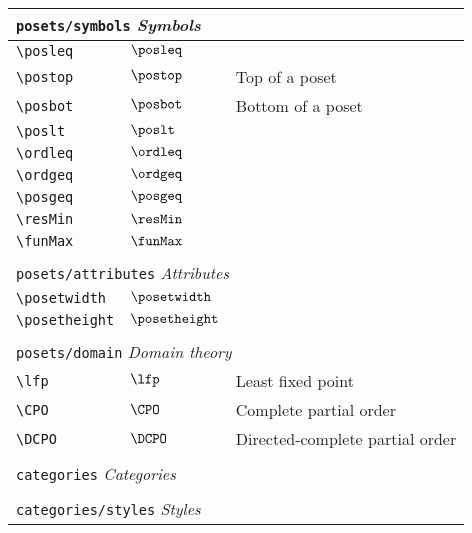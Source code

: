 \begin{longtable}{lll}
 \multicolumn{3}{l}{{\color[rgb]{0.5,0.5,0.5}\texttt{posets/symbols}} \emph{Symbols}}\\ 
 \hline
{\color[rgb]{0.5,0.5,0.5}\texttt{\textbackslash posleq}} & $\posleq$ & \\ 
 {\color[rgb]{0.5,0.5,0.5}\texttt{\textbackslash postop}} & $\postop$ &  Top of a poset\\ 
 {\color[rgb]{0.5,0.5,0.5}\texttt{\textbackslash posbot}} & $\posbot$ &  Bottom of a poset\\ 
 {\color[rgb]{0.5,0.5,0.5}\texttt{\textbackslash poslt}} & $\poslt$ & \\ 
 {\color[rgb]{0.5,0.5,0.5}\texttt{\textbackslash ordleq}} & $\ordleq$ & \\ 
 {\color[rgb]{0.5,0.5,0.5}\texttt{\textbackslash ordgeq}} & $\ordgeq$ & \\ 
 {\color[rgb]{0.5,0.5,0.5}\texttt{\textbackslash posgeq}} & $\posgeq$ & \\ 
 {\color[rgb]{0.5,0.5,0.5}\texttt{\textbackslash resMin}} & $\resMin$ & \\ 
 {\color[rgb]{0.5,0.5,0.5}\texttt{\textbackslash funMax}} & $\funMax$ & \\ 
  &  & \\ 
 \multicolumn{3}{l}{{\color[rgb]{0.5,0.5,0.5}\texttt{posets/attributes}} \emph{Attributes}}\\ 
 \hline
{\color[rgb]{0.5,0.5,0.5}\texttt{\textbackslash posetwidth}} & $\posetwidth$ & \\ 
 {\color[rgb]{0.5,0.5,0.5}\texttt{\textbackslash posetheight}} & $\posetheight$ & \\ 
  &  & \\ 
 \multicolumn{3}{l}{{\color[rgb]{0.5,0.5,0.5}\texttt{posets/domain}} \emph{Domain theory}}\\ 
 \hline
{\color[rgb]{0.5,0.5,0.5}\texttt{\textbackslash lfp}} & $\lfp$ &  Least fixed point\\ 
 {\color[rgb]{0.5,0.5,0.5}\texttt{\textbackslash CPO}} & $\CPO$ &  Complete partial order\\ 
 {\color[rgb]{0.5,0.5,0.5}\texttt{\textbackslash DCPO}} & $\DCPO$ &  Directed-complete partial order\\ 
  &  & \\ 
 \multicolumn{3}{l}{{\color[rgb]{0.5,0.5,0.5}\texttt{categories}} \emph{Categories}}\\ 
 \hline
\hline
 &  & \\ 
 \multicolumn{3}{l}{{\color[rgb]{0.5,0.5,0.5}\texttt{categories/styles}} \emph{Styles}}\\ 

\end{longtable}
